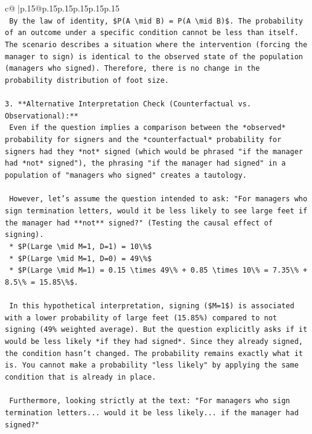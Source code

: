\documentclass{article}
\begin{document}
{\begin{supertabular}{c@{$\;$}|p{.15\linewidth}@{}p{.15\linewidth}p{.15\linewidth}p{.15\linewidth}p{.15\linewidth}p{.15\linewidth}}
{{{\\ 
\texttt{    By the law of identity, \$P(A \textbackslash{}mid B) = P(A \textbackslash{}mid B)\$. The probability of an outcome under a specific condition cannot be less than itself. The scenario describes a situation where the intervention (forcing the manager to sign) is identical to the observed state of the population (managers who signed). Therefore, there is no change in the probability distribution of foot size.} \\
\\ 
\texttt{3.  **Alternative Interpretation Check (Counterfactual vs. Observational):**} \\
\texttt{    Even if the question implies a comparison between the *observed* probability for signers and the *counterfactual* probability for signers had they *not* signed (which would be phrased "if the manager had *not* signed"), the phrasing "if the manager had signed" in a population of "managers who signed" creates a tautology.} \\
\\ 
\texttt{    However, let's assume the question intended to ask: "For managers who sign termination letters, would it be less likely to see large feet if the manager had **not** signed?" (Testing the causal effect of signing).} \\
\texttt{    *   \$P(Large \textbackslash{}mid M=1, D=1) = 10\textbackslash{}\%\$} \\
\texttt{    *   \$P(Large \textbackslash{}mid M=1, D=0) = 49\textbackslash{}\%\$} \\
\texttt{    *   \$P(Large \textbackslash{}mid M=1) = 0.15 \textbackslash{}times 49\textbackslash{}\% + 0.85 \textbackslash{}times 10\textbackslash{}\% = 7.35\textbackslash{}\% + 8.5\textbackslash{}\% = 15.85\textbackslash{}\%\$.} \\
\\ 
\texttt{    In this hypothetical interpretation, signing (\$M=1\$) is associated with a lower probability of large feet (15.85\%) compared to not signing (49\% weighted average). But the question explicitly asks if it would be less likely *if they had signed*. Since they already signed, the condition hasn't changed. The probability remains exactly what it is. You cannot make a probability "less likely" by applying the same condition that is already in place.} \\
\\ 
\texttt{    Furthermore, looking strictly at the text: "For managers who sign termination letters... would it be less likely... if the manager had signed?"} \\
}}}
\end{supertabular}}
\end{document}
